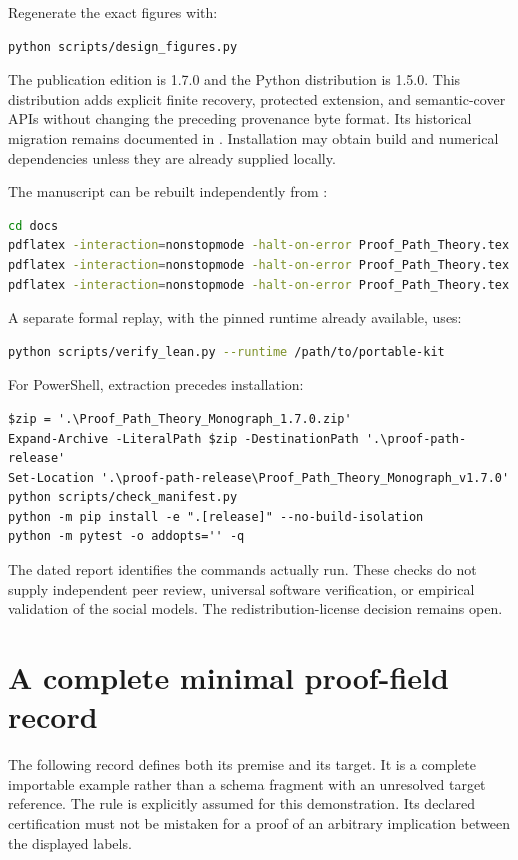 \documentclass[11pt,oneside]{article}
\theoremstyle{komorebiplain}
\theoremstyle{komorebidefinition}
\theoremstyle{komorebiremark}
\begin{document}
Regenerate the exact figures with:
\begin{lstlisting}[language=bash]
python scripts/design_figures.py
\end{lstlisting}
The publication edition is 1.7.0 and the Python distribution is 1.5.0. This distribution adds explicit finite recovery, protected extension, and semantic-cover APIs without changing the preceding provenance byte format. Its historical migration remains documented in . Installation may obtain build and numerical dependencies unless they are already supplied locally.

The manuscript can be rebuilt independently from :
\begin{lstlisting}[language=bash]
cd docs
pdflatex -interaction=nonstopmode -halt-on-error Proof_Path_Theory.tex
pdflatex -interaction=nonstopmode -halt-on-error Proof_Path_Theory.tex
pdflatex -interaction=nonstopmode -halt-on-error Proof_Path_Theory.tex
\end{lstlisting}

A separate formal replay, with the pinned runtime already available, uses:
\begin{lstlisting}[language=bash]
python scripts/verify_lean.py --runtime /path/to/portable-kit
\end{lstlisting}

For PowerShell, extraction precedes installation:
\begin{lstlisting}[language={},basicstyle=\ttfamily\fontsize{9.5}{11.4}\selectfont]
$zip = '.\Proof_Path_Theory_Monograph_1.7.0.zip'
Expand-Archive -LiteralPath $zip -DestinationPath '.\proof-path-release'
Set-Location '.\proof-path-release\Proof_Path_Theory_Monograph_v1.7.0'
python scripts/check_manifest.py
python -m pip install -e ".[release]" --no-build-isolation
python -m pytest -o addopts='' -q
\end{lstlisting}

The dated report identifies the commands actually run. These checks do not supply independent peer review, universal software verification, or empirical validation of the social models. The redistribution-license decision remains open.

\clearpage
\section{A complete minimal proof-field record}
\label{app:schema}

The following record defines both its premise and its target. It is a complete importable example rather than a schema fragment with an unresolved target reference. The rule is explicitly assumed for this demonstration. Its declared certification must not be mistaken for a proof of an arbitrary implication between the displayed labels.
\end{document}

